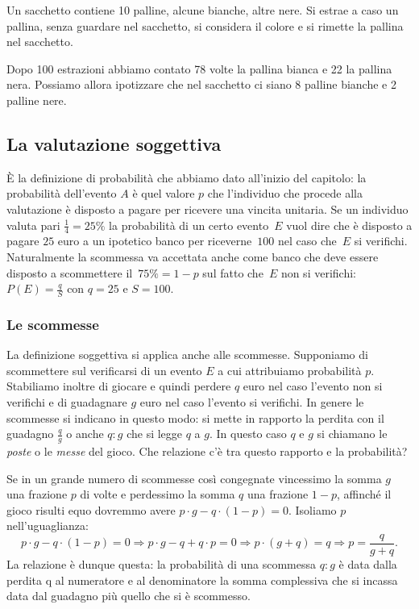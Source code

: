 \begin{esempio}
Un sacchetto contiene 10 palline, alcune bianche, altre nere. Si estrae a 
caso un pallina, senza guardare nel sacchetto, si considera il colore e si 
rimette la pallina nel sacchetto.

Dopo 100 estrazioni abbiamo contato 78 volte la pallina bianca e 22 la 
pallina nera. Possiamo allora ipotizzare che nel sacchetto ci siano 8 
palline bianche e 2 palline nere.
\end{esempio}

\subsection{La valutazione soggettiva}

È la definizione di probabilità che abbiamo dato all'inizio del capitolo: 
la probabilità dell'evento $A$ è quel valore $p$ che l'individuo che 
procede alla valutazione è disposto a pagare per ricevere una vincita 
unitaria. 
Se un individuo valuta pari $\frac 1 4=25\%$ la probabilità di un certo 
evento~$E$ vuol dire che è disposto a pagare $25$ euro a un ipotetico banco 
per riceverne~$100$ nel caso che~$E$ si verifichi. Naturalmente la 
scommessa va accettata anche come banco che deve essere disposto a 
scommettere il~$75\%=1-p$ sul fatto che~$E$ non si 
verifichi: $P(E)=\frac q S$ con $ q=25 $ e $S=100$.

\subsubsection*{Le scommesse}

La definizione soggettiva si applica anche alle scommesse. Supponiamo di 
scommettere sul verificarsi di un evento $E$ a cui attribuiamo probabilità 
$p$. 
Stabiliamo inoltre di giocare e quindi perdere $q$ euro nel caso l'evento 
non 
si 
verifichi e di guadagnare $g$ euro nel caso l'evento si verifichi. In 
genere le 
scommesse si indicano in questo modo: si mette in rapporto la perdita con 
il 
guadagno $\frac q g$ o anche $q:g$ che si legge $q$ a $g$. In questo caso 
$q$ e 
$g$ si chiamano le \emph{poste} o le \emph{messe} del gioco.
Che relazione c'è tra questo rapporto e la probabilità?

Se in un grande numero di scommesse così congegnate vincessimo la somma $g$ 
una 
frazione $p$ di volte e perdessimo la somma $q$ una frazione $1-p$, 
affinché il 
gioco risulti equo dovremmo avere $p\cdot g-q\cdot (1-p)=0$. Isoliamo $p$ 
nell'uguaglianza:
\begin{equation*}
p\cdot g-q\cdot (1-p)=0 \Rightarrow p\cdot g-q+q\cdot p=0\Rightarrow p\cdot 
(g+q)=q \Rightarrow p=\frac q{g+q}.
\end{equation*}
La relazione è dunque questa: la probabilità di una scommessa $q:g$ è data 
dalla 
perdita q al numeratore e al denominatore la somma complessiva che si 
incassa 
data dal guadagno più quello che si è scommesso.


